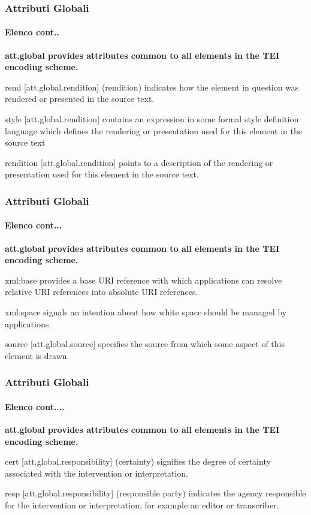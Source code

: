 \begin{frame}
    \frametitle{Attributi Globali}
    \framesubtitle{Elenco cont..}
    \addtocounter{nframe}{1}


\textbf{\textmd{att.global} provides attributes common to all elements in the TEI encoding scheme.}

\begin{description}
    \item rend [att.global.rendition]	(rendition) indicates how the element in question was rendered or presented in the source text.
    \item style [att.global.rendition]	contains an expression in some formal style definition language which defines the rendering or presentation used for this element in the source text
    \item rendition [att.global.rendition]	points to a description of the rendering or presentation used for this element in the source text.
\end{description}

\end{frame}

\begin{frame}
    \frametitle{Attributi Globali}
    \framesubtitle{Elenco cont...}
    \addtocounter{nframe}{1}


\textbf{\textmd{att.global} provides attributes common to all elements in the TEI encoding scheme.}

\begin{description}
    \item xml:base	provides a base URI reference with which applications can resolve relative URI references into absolute URI references.
    \item xml:space	signals an intention about how white space should be managed by applications.
    \item source [att.global.source]	specifies the source from which some aspect of this element is drawn.
\end{description}

\end{frame}

\begin{frame}
    \frametitle{Attributi Globali}
    \framesubtitle{Elenco cont....}
    \addtocounter{nframe}{1}


\textbf{\textmd{att.global} provides attributes common to all elements in the TEI encoding scheme.}

\begin{description}
    \item  cert [att.global.responsibility]	(certainty) signifies the degree of certainty associated with the intervention or interpretation.
    \item resp [att.global.responsibility]	(responsible party) indicates the agency responsible for the intervention or interpretation, for example an editor or transcriber.
\end{description}

\end{frame}


